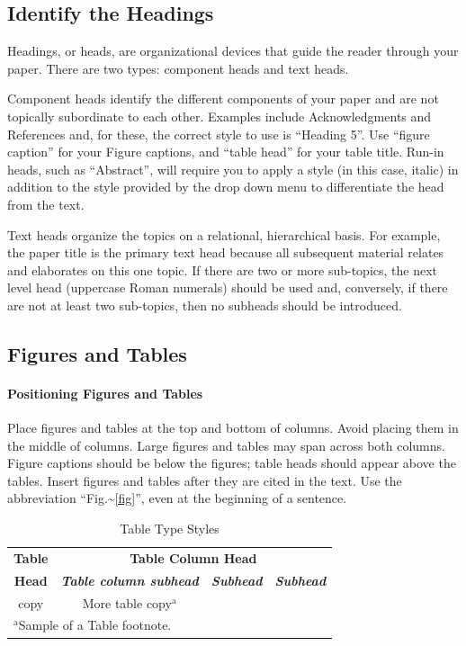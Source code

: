 \documentclass[conference]{IEEEtran}
\begin{document}
\subsection{Identify the Headings}
\label{sec:orgbc635ef}
Headings, or heads, are organizational devices that guide the reader through your paper. There are two types: component heads and text heads.

Component heads identify the different components of your paper and are not topically subordinate to each other. Examples include Acknowledgments and References and, for these, the correct style to use is ``Heading 5''. Use 
``figure caption'' for your Figure captions, and ``table head'' for your table title. Run-in heads, such as ``Abstract'', will require you to apply a style (in this case, italic) in addition to the style provided by the drop down menu to differentiate the head from the text.

Text heads organize the topics on a relational, hierarchical basis. For example, the paper title is the primary text head because all subsequent material relates and elaborates on this one topic. If there are two or more sub-topics, the next level head (uppercase Roman numerals) should be used and, conversely, if there are not at least two sub-topics, then no subheads should be introduced.

\subsection{Figures and Tables}
\label{sec:org00e4021}
   \paragraph{Positioning Figures and Tables} Place figures and tables at the top and 
bottom of columns. Avoid placing them in the middle of columns. Large figures and tables may span across both columns. Figure captions should be below the figures; table heads should appear above the tables. Insert figures and tables after they are cited in the text. Use the abbreviation ``Fig.\textasciitilde{}\ref{fig}'', even at the beginning of a sentence.

\begin{table}[htbp]
\caption{Table Type Styles}
\begin{center}
\begin{tabular}{|c|c|c|c|}
\hline
\textbf{Table}&\multicolumn{3}{|c|}{\textbf{Table Column Head}} \\
\cline{2-4} 
\textbf{Head} & \textbf{\textit{Table column subhead}}& \textbf{\textit{Subhead}}& \textbf{\textit{Subhead}} \\
\hline
copy& More table copy$^{\mathrm{a}}$& &  \\
\hline
\multicolumn{4}{l}{$^{\mathrm{a}}$Sample of a Table footnote.}
\end{tabular}
\label{tab1}
\end{center}
\end{table}
\end{document}
